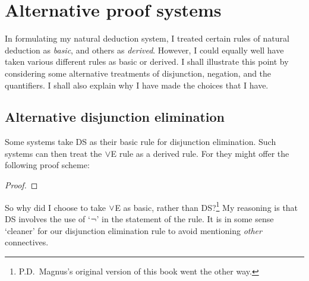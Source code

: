 
\chapter{Alternative proof systems}
In formulating my natural deduction system, I treated certain rules of natural deduction as \emph{basic}, and others as \emph{derived}. However, I could equally well have taken various different rules as basic or derived. I shall illustrate this point by considering some alternative treatments of disjunction, negation, and the quantifiers. I shall also explain why I have made the choices that I have.


\section{Alternative disjunction elimination}
Some systems take DS as their basic rule for disjunction elimination. Such systems can then treat the $\vee$E rule as a derived rule. For they might offer the following proof scheme: 
	\begin{proof}
		\open
			 {}
		\close
		\open
		\close
		\open
		\close
		\open
		\open
		\close
	\close
\end{proof}
So why did I choose to take $\vee$E as basic, rather than DS?\footnote{P.D.\ Magnus's original version of this book went the other way.} My reasoning is that DS involves the use of `$\neg$' in the statement of the rule. It is in some sense `cleaner' for our disjunction elimination rule to avoid mentioning \emph{other} connectives. 


